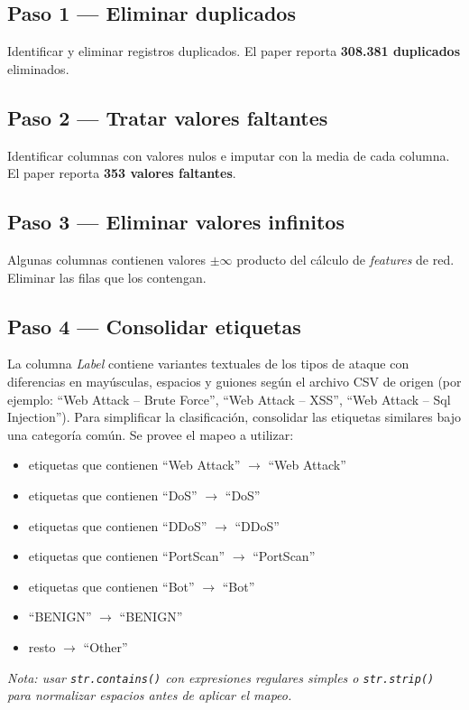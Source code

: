 \documentclass[11pt,a4paper]{article}
\newcommand{\codigo}[1]{\texttt{#1}}
\begin{document}
\subsection*{Paso 1 --- Eliminar duplicados}
Identificar y eliminar registros duplicados. El paper reporta \textbf{308.381 duplicados} eliminados.

\subsection*{Paso 2 --- Tratar valores faltantes}
Identificar columnas con valores nulos e imputar con la media de cada columna. El paper reporta \textbf{353 valores faltantes}.

\subsection*{Paso 3 --- Eliminar valores infinitos}
Algunas columnas contienen valores $\pm\infty$ producto del c\'alculo de \textit{features} de red. Eliminar las filas que los contengan.

\subsection*{Paso 4 --- Consolidar etiquetas}
La columna \textit{Label} contiene variantes textuales de los tipos de ataque con diferencias en may\'usculas, espacios y guiones seg\'un el archivo CSV de origen (por ejemplo: ``Web Attack -- Brute Force'', ``Web Attack -- XSS'', ``Web Attack -- Sql Injection''). Para simplificar la clasificaci\'on, consolidar las etiquetas similares bajo una categor\'ia com\'un. Se provee el mapeo a utilizar:
\begin{itemize}[leftmargin=2em,itemsep=2pt]
    \item etiquetas que contienen ``Web Attack'' $\rightarrow$ ``Web Attack''
    \item etiquetas que contienen ``DoS'' $\rightarrow$ ``DoS''
    \item etiquetas que contienen ``DDoS'' $\rightarrow$ ``DDoS''
    \item etiquetas que contienen ``PortScan'' $\rightarrow$ ``PortScan''
    \item etiquetas que contienen ``Bot'' $\rightarrow$ ``Bot''
    \item ``BENIGN'' $\rightarrow$ ``BENIGN''
    \item resto $\rightarrow$ ``Other''
\end{itemize}
\textit{Nota: usar \codigo{str.contains()} con expresiones regulares simples o \codigo{str.strip()} para normalizar espacios antes de aplicar el mapeo.}
\end{document}
